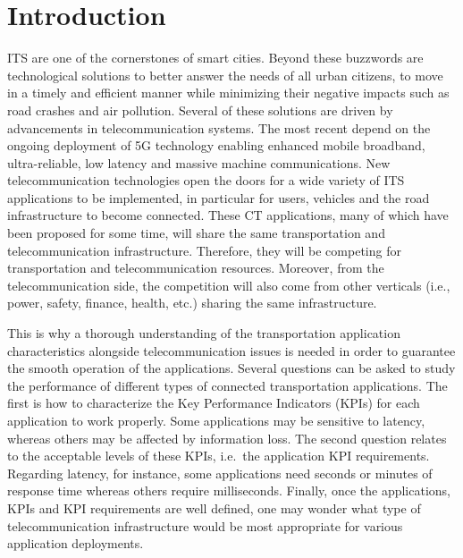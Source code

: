 \section{Introduction}
\acrfull{ITS} are one of the cornerstones of smart cities. Beyond these buzzwords are technological solutions to better answer the needs of all urban citizens, to move in a timely and efficient manner while minimizing their negative impacts such as road crashes and air pollution. 
Several of these solutions are driven by advancements in telecommunication systems. The most recent depend on the ongoing deployment of 5G technology enabling enhanced mobile broadband, ultra-reliable, low latency and massive machine communications. New telecommunication technologies open the doors for a wide variety of ITS applications to be implemented, in particular for users, vehicles and the road infrastructure to become connected. 
These \acrfull{CT} applications, many of which have been proposed for some time, will share the same transportation and telecommunication infrastructure. Therefore, they will be competing for transportation and telecommunication resources. Moreover, from the telecommunication side, the competition will also come from other verticals (i.e., power, safety, finance, health, etc.) sharing the same infrastructure.

This is why a thorough understanding of the transportation application characteristics alongside telecommunication issues is needed in order to guarantee the smooth operation of the applications. 
Several questions can be asked to study the performance of different types of connected transportation applications. The first is how to characterize the Key Performance Indicators (\acrshort{KPI}s) for each application to work properly. Some applications may be sensitive to latency, whereas others may be affected by information loss. The second question relates to the acceptable levels of these \acrshort{KPI}s, i.e.\ the application \acrshort{KPI} requirements. Regarding latency, for instance, some applications need seconds or minutes of response time whereas others require milliseconds. Finally, once the applications, \acrshort{KPI}s and \acrshort{KPI} requirements are well defined, one may wonder what type of telecommunication infrastructure would be most appropriate for various application deployments. 

